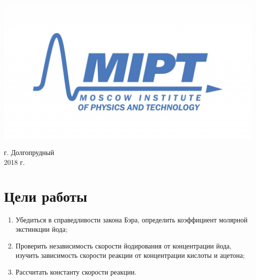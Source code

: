 \documentclass[a4paper, 12pt]{article}
\newenvironment{bottompar}{\par\vspace*{\fill}}{\clearpage}
\begin{document}
\begin{titlepage}
\begin{bottompar}
	\begin{center}
		\includegraphics[width = 80 mm]{logo.jpg}
	\end{center}
	{\large г. Долгопрудный\\2018 г.}

\end{bottompar}
\vfill %

\end{titlepage}

\setcounter{page}{2}

\newpage
\section{Цели работы}
	\begin{enumerate}
	
		\item 
		Убедиться в справедливости закона Бэра, определить коэффициент молярной экстинкции йода;
		\item
		Проверить независимость скорости йодирования от концентрации йода, изучить зависимость скорости реакции от концентрации кислоты и ацетона;
		\item 
		Рассчитать константу скорости реакции.
		 
	
	\end{enumerate}
	
\end{document}
